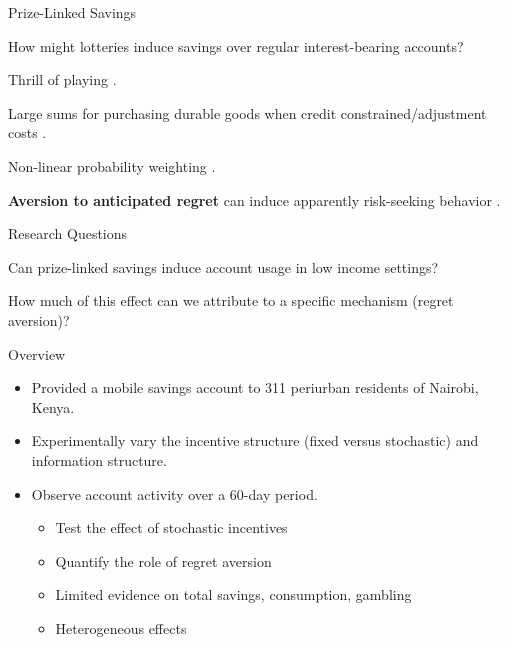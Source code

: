 \documentclass[aspectratio=169]{beamer}
\newenvironment{wideitemize}{\itemize\addtolength{\itemsep}{10pt}}{\enditemize}
\newenvironment{wideenumerate}{\enumerate\addtolength{\itemsep}{10pt}}{\endenumerate}
\begin{document}
\begin{frame}{Prize-Linked Savings}


	How might lotteries induce savings over regular interest-bearing accounts?


	\begin{wideitemize}
		\item Thrill of playing \parencite{conlisk_utility_1993}.
		\item Large sums for purchasing durable goods when credit constrained/adjustment costs \parencite{herskowitz_gambling_2016}.
		\item Non-linear probability weighting \parencite{kahneman_advances_1992}.
		\item \textbf{Aversion to anticipated regret} can induce apparently risk-seeking behavior \parencite{loomes_regret_1982,bell_risk_1983,zeelenberg_consequences_1996}.
	\end{wideitemize}

\end{frame}

\begin{frame}{Research Questions}

	\begin{wideenumerate}

		\item Can prize-linked savings induce account usage in low income settings?
		\item How much of this effect can we attribute to a specific mechanism (regret aversion)?

	\end{wideenumerate}

\end{frame}

\begin{frame}{Overview}

	\begin{itemize}

		\item Provided a mobile savings account to 311 periurban residents of Nairobi, Kenya.
		\item Experimentally vary the incentive structure (fixed versus stochastic) and information structure.
		\item Observe account activity over a 60-day period.

		\begin{itemize}
			\item Test the effect of stochastic incentives
			\item Quantify the role of regret aversion
			\item Limited evidence on total savings, consumption, gambling
			\item Heterogeneous effects
		\end{itemize}

	\end{itemize}

\end{frame}
\end{document}
